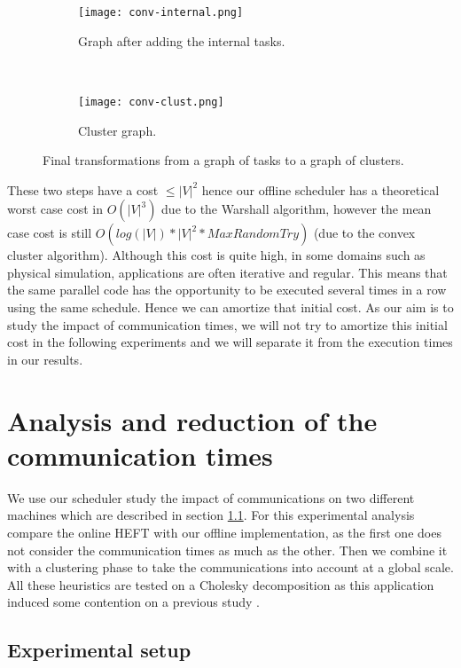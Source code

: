 \documentclass[10pt, conference, compsocconf,pdftex,dvipsnames]{IEEEtran}
\begin{document}
\begin{figure}[t!]
    \centering
    \begin{subfigure}{0.24\textwidth}
        \centering
        \texttt{[image: conv-internal.png]}
        \caption{Graph after adding the internal tasks.}
        \label{fig:conv-int}
    \end{subfigure}
    ~
    \begin{subfigure}{0.1\textwidth}
        \centering
        \texttt{[image: conv-clust.png]}
        \caption{Cluster graph.}
        \label{fig:conv-clust}
    \end{subfigure}
    \caption{Final transformations from a graph of tasks to a graph of
    clusters.}
    \label{fig:conv-end}
\end{figure}

These two steps have a cost $\leq |V|^2$ hence our offline scheduler has a
theoretical worst case cost in $O(|V|^3)$ due to the Warshall algorithm,
however the mean case cost is still $O(log(|V|)*|V|^2*MaxRandomTry)$ (due to
the convex cluster algorithm).  Although this cost is quite high, in some
domains such as physical simulation, applications are often
iterative and regular. This means that the same parallel code has the
opportunity to be executed several times in a row using the same schedule.
Hence we can amortize that initial cost. As our aim is to study the impact of
communication times, we will not try to amortize this initial cost in the
following experiments and we will separate it from the execution times in our
results.

\section{Analysis and reduction of the communication times}
\label{sec:exp}

We use our scheduler study the impact of communications on two different
machines which are described in section \ref{sec:exp-set}. For this
experimental analysis compare the online HEFT with our offline implementation,
as the first one does not consider the communication times as much as the
other. Then we combine it with a clustering phase to take the communications
into account at a global scale. All these heuristics are tested on a
Cholesky decomposition as this application induced some contention on a
previous study \cite{ferreiralima:hal-00735470}.


\subsection{Experimental setup}
\label{sec:exp-set}
\end{document}
